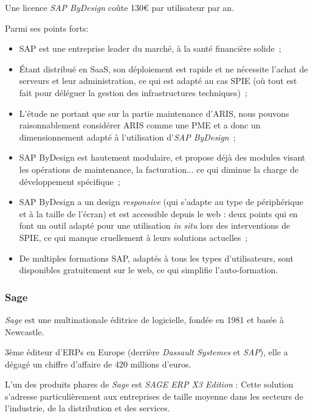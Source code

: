             Une licence \textit{SAP ByDesign} coûte 130€ par utilisateur par an.

            Parmi ses points forts:

            \begin{itemize}
                \item SAP est une entreprise leader du marché, à la santé financière solide~;
                \item Étant distribué en SaaS, son déploiement est rapide et ne nécessite l'achat de serveurs et leur administration, ce qui est adapté au cas SPIE (où tout est fait pour déléguer la gestion des infrastructures techniques)~;
                \item L'étude ne portant que sur la partie maintenance d'ARIS, nous pouvons raisonnablement considérer ARIS comme une PME et a donc un dimensionnement adapté à l'utilisation d'\textit{SAP ByDesign}~;
                \item SAP ByDesign est hautement modulaire, et propose déjà des modules visant les opérations de maintenance, la facturation... ce qui diminue la charge de développement spécifique~;
                \item SAP ByDesign a un design \textit{responsive} (qui s'adapte au type de périphérique et à la taille de l'écran) et est accessible depuis le web : deux points qui en font un outil adapté pour une utilisation \textit{in situ} lors des interventions de SPIE, ce qui manque cruellement à leurs solutions actuelles~;
                \item De multiples formations SAP, adaptés à tous les types d'utilisateurs, sont disponibles gratuitement sur le web, ce qui simplifie l'auto-formation.
            \end{itemize}


        \subsubsection{Sage}

            \textit{Sage} est une multinationale éditrice de logicielle, fondée en 1981 et basée à Newcastle.

            3ème éditeur d'ERPs en Europe (derrière \textit{Dassault Systemes} et \textit{SAP}), elle a dégagé un chiffre d'affaire de 420 millions d'euros.

            L'un des produits phares de \textit{Sage} est \textit{SAGE ERP X3 Edition} : Cette solution s'adresse particulièrement aux entreprises de taille moyenne dans les secteurs de l'industrie, de la distribution et des services.

